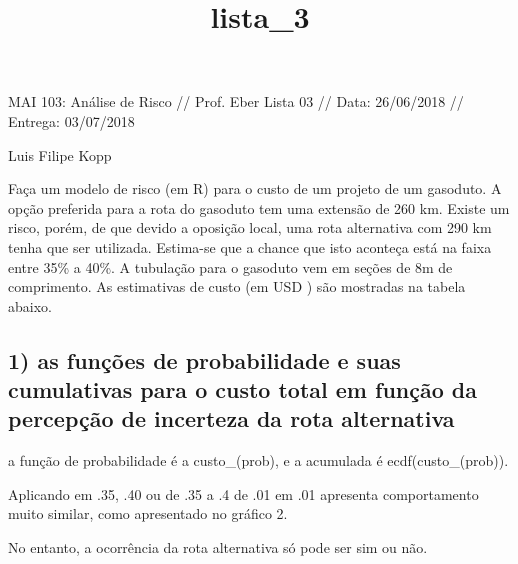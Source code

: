 \documentclass[11pt]{article}
\title{lista\_3}
\begin{document}
    
    
    \maketitle
    
    

    
    MAI 103: Análise de Risco // Prof. Eber Lista 03 // Data: 26/06/2018 //
Entrega: 03/07/2018

Luis Filipe Kopp

    Faça um modelo de risco (em R) para o custo de um projeto de um
gasoduto. A opção preferida para a rota do gasoduto tem uma extensão de
260 km. Existe um risco, porém, de que devido a oposição local, uma rota
alternativa com 290 km tenha que ser utilizada. Estima-se que a chance
que isto aconteça está na faixa entre 35\% a 40\%. A tubulação para o
gasoduto vem em seções de 8m de comprimento. As estimativas de custo (em
USD ) são mostradas na tabela abaixo.


    \subsection{1) as funções de probabilidade e suas cumulativas para o
custo total em função da percepção de incerteza da rota
alternativa}\label{as-funuxe7uxf5es-de-probabilidade-e-suas-cumulativas-para-o-custo-total-em-funuxe7uxe3o-da-percepuxe7uxe3o-de-incerteza-da-rota-alternativa}

    a função de probabilidade é a custo\_(prob), e a acumulada é
ecdf(custo\_(prob)).

Aplicando em .35, .40 ou de .35 a .4 de .01 em .01 apresenta
comportamento muito similar, como apresentado no gráfico 2.

No entanto, a ocorrência da rota alternativa só pode ser sim ou não.

    \begin{center}
    \end{center}
\end{document}

